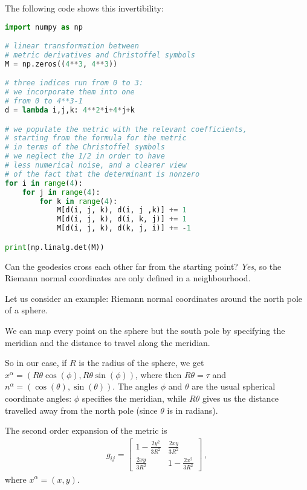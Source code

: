 \documentclass[main.tex]{subfiles}
\begin{document}
The following code shows this invertibility: 

\begin{lstlisting}[language=Python]
import numpy as np

# linear transformation between
# metric derivatives and Christoffel symbols
M = np.zeros((4**3, 4**3))

# three indices run from 0 to 3:
# we incorporate them into one
# from 0 to 4**3-1
d = lambda i,j,k: 4**2*i+4*j+k

# we populate the metric with the relevant coefficients,
# starting from the formula for the metric
# in terms of the Christoffel symbols
# we neglect the 1/2 in order to have
# less numerical noise, and a clearer view
# of the fact that the determinant is nonzero
for i in range(4):
    for j in range(4):
        for k in range(4):
            M[d(i, j, k), d(i, j ,k)] += 1
            M[d(i, j, k), d(i, k, j)] += 1
            M[d(i, j, k), d(k, j, i)] += -1

print(np.linalg.det(M))
\end{lstlisting}

Can the geodesics cross each other far from the starting point? \emph{Yes}, so the Riemann normal coordinates are only defined in a neighbourhood.

Let us consider an example: Riemann normal coordinates around the north pole of a sphere.

We can map every point on the sphere but the south pole by specifying the meridian and the distance to travel along the meridian.

So in our case, if \(R\) is the radius of the sphere, we get \(x^{\alpha } = (R \theta \cos(\phi ), R \theta \sin(\phi ))\), where then \(R \theta = \tau \) and \(n^{\alpha } = (\cos(\theta ), \sin(\theta ))\).
The angles \(\phi \) and \(\theta \) are the usual spherical coordinate angles: \(\phi \) specifies the meridian, while \(R\theta \) gives us the distance travelled away from the north pole (since \(\theta \) is in radians).

The second order expansion of the metric is 
%
\begin{align}
  g_{ij} = \left[\begin{array}{cc}
  1 - \frac{2y^2}{3R^2} & \frac{2xy}{3R^2} \\ 
  \frac{2xy}{3R^2} & 1-\frac{2x^2}{3R^2}
  \end{array}\right]
\,,
\end{align}
%
where \(x^{\alpha } = (x, y)\).
\end{document}
